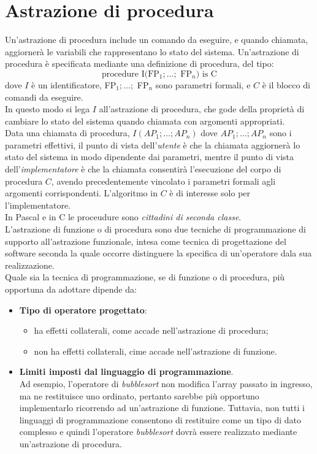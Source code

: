 \documentclass[12pt]{report}
\begin{document}
 	\section{Astrazione di procedura}
 	Un'astrazione di procedura include un comando da eseguire, e quando chiamata, aggiornerà le variabili che rappresentano lo stato del sistema. Un'astrazione di procedura è specificata mediante una definizione di procedura, del tipo:
 	\[
 	\text{procedure I(FP$_1; \dots;$ FP$_n$) is C}
 	\]
 	dove $I$ è un identificatore, FP$_1; \dots; $ FP$_n$ sono parametri formali, e $C$ è il blocco di comandi da eseguire. \\
 	In questo modo si lega $I$ all'astrazione di procedura, che gode della proprietà di cambiare lo stato del sistema quando chiamata con argomenti appropriati. \\
 	Data una chiamata di procedura, $I(AP_1;\dots; AP_n)$ dove $AP_1;\dots; AP_n$ sono i parametri effettivi, il punto di vista dell'\textit{utente} è che la chiamata aggiornerà lo stato del sistema in modo dipendente dai parametri, mentre il punto di vista dell'\textit{implementatore} è che la chiamata consentirà l'esecuzione del corpo di procedura $C$, avendo precedentemente vincolato i parametri formali agli argomenti corrispondenti. L'algoritmo in $C$ è di interesse solo per l'implementatore. \\
 	In Pascal e in C le proceudure sono \textit{cittadini di seconda classe}. \\
 	L'astrazione di funzione o di procedura sono due tecniche di programmazione di supporto all'astrazione funzionale, intesa come tecnica di progettazione del software seconda la quale occorre distinguere la specifica di un'operatore dala sua realizzazione. \\
 	Quale sia la tecnica di programmazione, se di funzione o di procedura, più opportuna da adottare dipende da:
 	\begin{itemize}
 		\item \textbf{Tipo di operatore progettato}:
 		\begin{itemize}
 			\item ha effetti collaterali, come accade nell'astrazione di procedura;
 			\item non ha effetti collaterali, cime accade nell'astrazione di funzione.
 		\end{itemize}
 		\item \textbf{Limiti imposti dal linguaggio di programmazione}. \\
 		Ad esempio, l'operatore di \textit{bubblesort} non modifica l'array passato in ingresso, ma ne restituisce uno ordinato, pertanto sarebbe più opportuno implementarlo ricorrendo ad un'astrazione di funzione. Tuttavia, non tutti i linguaggi di programmazione consentono di restituire come un tipo di dato complesso e quindi l'operatore \textit{bubblesort} dovrà essere realizzato mediante un'astrazione di procedura.
 	\end{itemize}
\end{document}
